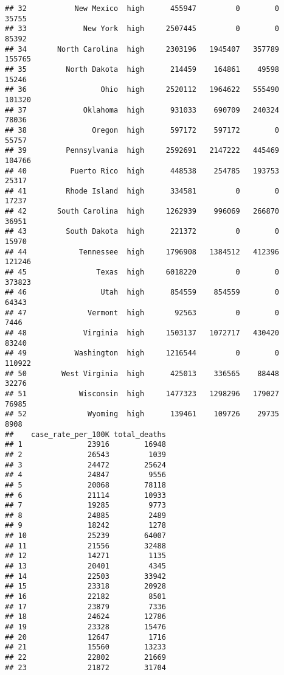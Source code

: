 \documentclass[
]{article}
\begin{document}
\begin{verbatim}
## 32           New Mexico  high      455947         0        0             35755
## 33             New York  high     2507445         0        0             85392
## 34       North Carolina  high     2303196   1945407   357789            155765
## 35         North Dakota  high      214459    164861    49598             15246
## 36                 Ohio  high     2520112   1964622   555490            101320
## 37             Oklahoma  high      931033    690709   240324             78036
## 38               Oregon  high      597172    597172        0             55757
## 39         Pennsylvania  high     2592691   2147222   445469            104766
## 40          Puerto Rico  high      448538    254785   193753             25317
## 41         Rhode Island  high      334581         0        0             17237
## 42       South Carolina  high     1262939    996069   266870             36951
## 43         South Dakota  high      221372         0        0             15970
## 44            Tennessee  high     1796908   1384512   412396            121246
## 45                Texas  high     6018220         0        0            373823
## 46                 Utah  high      854559    854559        0             64343
## 47              Vermont  high       92563         0        0              7446
## 48             Virginia  high     1503137   1072717   430420             83240
## 49           Washington  high     1216544         0        0            110922
## 50        West Virginia  high      425013    336565    88448             32276
## 51            Wisconsin  high     1477323   1298296   179027             76985
## 52              Wyoming  high      139461    109726    29735              8908
##    case_rate_per_100K total_deaths
## 1               23916        16948
## 2               26543         1039
## 3               24472        25624
## 4               24847         9556
## 5               20068        78118
## 6               21114        10933
## 7               19285         9773
## 8               24885         2489
## 9               18242         1278
## 10              25239        64007
## 11              21556        32488
## 12              14271         1135
## 13              20401         4345
## 14              22503        33942
## 15              23318        20928
## 16              22182         8501
## 17              23879         7336
## 18              24624        12786
## 19              23328        15476
## 20              12647         1716
## 21              15560        13233
## 22              22802        21669
## 23              21872        31704

\end{verbatim}
\end{document}
